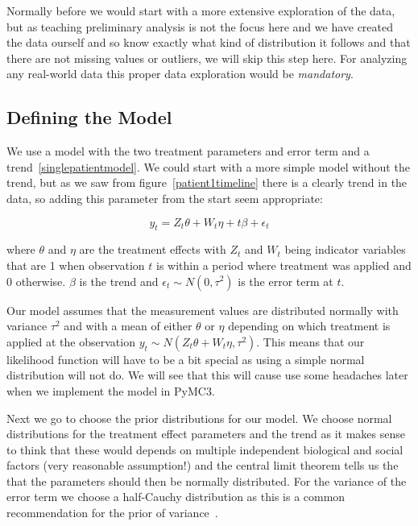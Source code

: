 \documentclass[12pt,a4paper,leqno]{report}
\theoremstyle{plain}
\theoremstyle{definition}
\theoremstyle{remark}
\begin{document}
Normally before we would start with a more extensive exploration of the data, but as teaching preliminary analysis
is not the focus here and we have created the data ourself and so know exactly what kind
of distribution it follows and that there are not missing values or outliers, we will
skip this step here. For analyzing any real-world data this proper data exploration would be \emph{mandatory}.

\subsection{Defining the Model}

We use a model with the two treatment parameters and error term and a trend\ \ref{singlepatientmodel}. We could
start with a more simple model without the trend, but as we saw from figure\ \ref{patient1timeline}
there is a clearly trend in the data, so adding this parameter from the start seem appropriate:

\begin{def}\label{}
    \begin{equation}\label{singlepatientmodel}
        y_t = Z_t\theta + W_t\eta + t\beta + \epsilon_t
    \end{equation}
\end{def} where \(\theta \) and \(\eta \) are the treatment effects with \(Z_t\) and \(W_t\) being indicator
variables that are 1 when observation \(t\) is within a period where treatment was applied and
0 otherwise. \(\beta \) is the trend and \(\epsilon_{t} \sim N(0,\tau^2) \) is the error term at \(t\).

Our model assumes that the measurement values are distributed normally with
variance \(\tau^2\) and with a mean of either \(\theta \) or \(\eta \) depending on which
treatment is applied at the observation \(y_t \sim N(Z_t\theta + W_t\eta, \tau^2)\).
This means that our likelihood function will have to be a bit special as using a simple
normal distribution will not do. We will see that this will cause use some headaches
later when we implement the model in PyMC3.

Next we go to choose the prior distributions for our model. We choose
normal distributions for the treatment effect parameters and the trend as it makes sense to think
that these would depends on multiple independent biological and social
factors (very reasonable assumption!) and the central limit theorem tells us the that
the parameters should then be normally distributed. For the variance of the error
term we choose a half-Cauchy distribution as this is a common recommendation for the
prior of variance\ \cite{variancepriors}.
\end{document}
